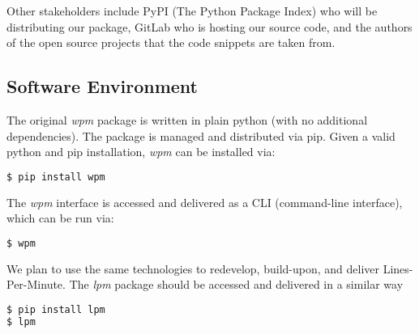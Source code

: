 \documentclass{article}
\begin{document}
Other stakeholders include PyPI (The Python Package Index) who will be distributing our package, GitLab who is hosting our source code, and the authors of the open source projects that the code snippets are taken from.

\subsection*{Software Environment}
The original \textit{wpm} package is written in plain python (with no additional dependencies). The package is managed and distributed via pip. Given a valid python and pip installation, \textit{wpm} can be installed via:

\begin{lstlisting}[language=bash]
$ pip install wpm
\end{lstlisting}
The \textit{wpm} interface is accessed and delivered as a CLI (command-line interface), which can be run via:
\begin{lstlisting}[language=bash]
$ wpm
\end{lstlisting}
We plan to use the same technologies to redevelop, build-upon, and deliver Lines-Per-Minute. The \textit{lpm} package should be accessed and delivered in a similar way
\begin{lstlisting}[language=bash]
$ pip install lpm
$ lpm
\end{lstlisting}



\newpage
\end{document}
